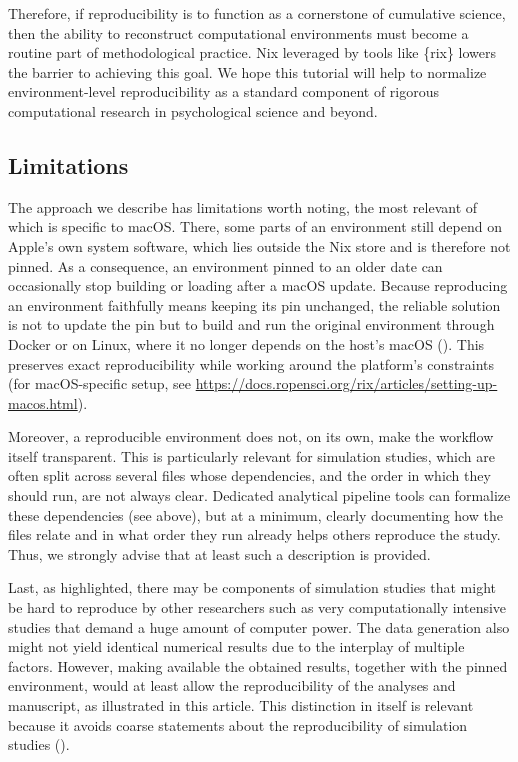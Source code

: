 \documentclass[
  man,
  longtable,
  nolmodern,
  notxfonts,
  notimes,
  colorlinks=true,linkcolor=blue,citecolor=blue,urlcolor=blue]{apa7}
\begin{document}
Therefore, if reproducibility is to function as a cornerstone of
cumulative science, then the ability to reconstruct computational
environments must become a routine part of methodological practice. Nix
leveraged by tools like \{rix\} lowers the barrier to achieving this
goal. We hope this tutorial will help to normalize environment-level
reproducibility as a standard component of rigorous computational
research in psychological science and beyond.

\subsection{Limitations}\label{limitations}

The approach we describe has limitations worth noting, the most relevant
of which is specific to macOS. There, some parts of an environment still
depend on Apple's own system software, which lies outside the Nix store
and is therefore not pinned. As a consequence, an environment pinned to
an older date can occasionally stop building or loading after a macOS
update. Because reproducing an environment faithfully means keeping its
pin unchanged, the reliable solution is not to update the pin but to
build and run the original environment through Docker or on Linux, where
it no longer depends on the host's macOS
(). This preserves exact reproducibility while working around the
platform's constraints (for macOS-specific setup, see
\url{https://docs.ropensci.org/rix/articles/setting-up-macos.html}).

Moreover, a reproducible environment does not, on its own, make the
workflow itself transparent. This is particularly relevant for
simulation studies, which are often split across several files whose
dependencies, and the order in which they should run, are not always
clear. Dedicated analytical pipeline tools can formalize these
dependencies (see above), but at a minimum, clearly documenting how the
files relate and in what order they run already helps others reproduce
the study. Thus, we strongly advise that at least such a description is
provided.

Last, as highlighted, there may be components of simulation studies that
might be hard to reproduce by other researchers such as very
computationally intensive studies that demand a huge amount of computer
power. The data generation also might not yield identical numerical
results due to the interplay of multiple factors. However, making
available the obtained results, together with the pinned environment,
would at least allow the reproducibility of the analyses and manuscript,
as illustrated in this article. This distinction in itself is relevant
because it avoids coarse statements about the reproducibility of
simulation studies ().
\end{document}

